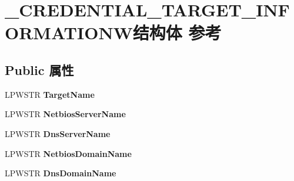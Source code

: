 \hypertarget{struct___c_r_e_d_e_n_t_i_a_l___t_a_r_g_e_t___i_n_f_o_r_m_a_t_i_o_n_w}{}\section{\+\_\+\+C\+R\+E\+D\+E\+N\+T\+I\+A\+L\+\_\+\+T\+A\+R\+G\+E\+T\+\_\+\+I\+N\+F\+O\+R\+M\+A\+T\+I\+O\+N\+W结构体 参考}
\label{struct___c_r_e_d_e_n_t_i_a_l___t_a_r_g_e_t___i_n_f_o_r_m_a_t_i_o_n_w}
\subsection*{Public 属性}
\begin{DoxyCompactItemize}
\item 
\mbox{\label{struct___c_r_e_d_e_n_t_i_a_l___t_a_r_g_e_t___i_n_f_o_r_m_a_t_i_o_n_w_ab14259240faf818355daf036b030afc4}} 
L\+P\+W\+S\+TR {\bfseries Target\+Name}
\item 
\mbox{\label{struct___c_r_e_d_e_n_t_i_a_l___t_a_r_g_e_t___i_n_f_o_r_m_a_t_i_o_n_w_aa1e57d35e43472d3f28e838282690dbd}} 
L\+P\+W\+S\+TR {\bfseries Netbios\+Server\+Name}
\item 
\mbox{\label{struct___c_r_e_d_e_n_t_i_a_l___t_a_r_g_e_t___i_n_f_o_r_m_a_t_i_o_n_w_add6511a2e152f93a0aaf605d1d7adad6}} 
L\+P\+W\+S\+TR {\bfseries Dns\+Server\+Name}
\item 
\mbox{\label{struct___c_r_e_d_e_n_t_i_a_l___t_a_r_g_e_t___i_n_f_o_r_m_a_t_i_o_n_w_ae2ae5a44c95b1c55135c1922ac6fb101}} 
L\+P\+W\+S\+TR {\bfseries Netbios\+Domain\+Name}
\item 
\mbox{\label{struct___c_r_e_d_e_n_t_i_a_l___t_a_r_g_e_t___i_n_f_o_r_m_a_t_i_o_n_w_af9f732e8b0b88916d09c7a518c6d7d38}} 
L\+P\+W\+S\+TR {\bfseries Dns\+Domain\+Name}
\item 
\mbox{\label{struct___c_r_e_d_e_n_t_i_a_l___t_a_r_g_e_t___i_n_f_o_r_m_a_t_i_o_n_w_a4af22b11dd16545870fceef26874ee59}} 

\end{DoxyCompactItemize}
